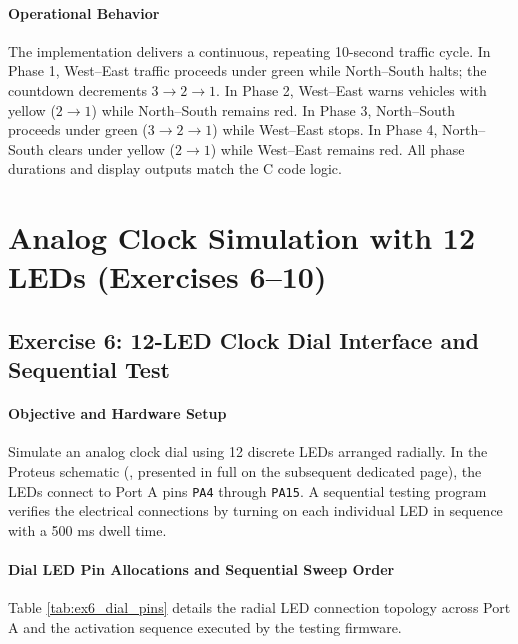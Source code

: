 \documentclass[oneside,final]{hcmut-report}
\begin{document}
\paragraph{Operational Behavior}
The implementation delivers a continuous, repeating 10-second traffic cycle. In Phase 1, West--East traffic proceeds under green while North--South halts; the countdown decrements $3 \to 2 \to 1$. In Phase 2, West--East warns vehicles with yellow ($2 \to 1$) while North--South remains red. In Phase 3, North--South proceeds under green ($3 \to 2 \to 1$) while West--East stops. In Phase 4, North--South clears under yellow ($2 \to 1$) while West--East remains red. All phase durations and display outputs match the C code logic.

\clearpage
\restoregeometry

\section{Analog Clock Simulation with 12 LEDs (Exercises 6--10)}
\label{sec:ex6to10}

\subsection{Exercise 6: 12-LED Clock Dial Interface and Sequential Test}
\label{subsec:ex6}
\paragraph{Objective and Hardware Setup}
Simulate an analog clock dial using 12 discrete LEDs arranged radially. In the Proteus schematic (, presented in full on the subsequent dedicated page), the LEDs connect to Port A pins \texttt{PA4} through \texttt{PA15}. A sequential testing program verifies the electrical connections by turning on each individual LED in sequence with a 500 ms dwell time.

\paragraph{Dial LED Pin Allocations and Sequential Sweep Order}
Table \ref{tab:ex6_dial_pins} details the radial LED connection topology across Port A and the activation sequence executed by the testing firmware.
\end{document}

